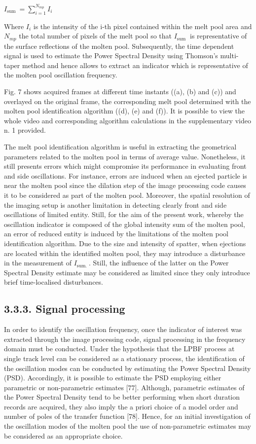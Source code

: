 \documentclass[10pt]{article}
\begin{document}
$I_{\text {sum }}=\sum_{i=1}^{N_{m p}} I_{i}$

Where $I_{i}$ is the intensity of the i-th pixel contained within the melt pool area and $N_{m p}$ the total number of pixels of the melt pool so that $I_{\text {sum }}$ is representative of the surface reflections of the molten pool. Subsequently, the time dependent signal is used to estimate the Power Spectral Density using Thomson's multi-taper method and hence allows to extract an indicator which is representative of the molten pool oscillation frequency.

Fig. 7 shows acquired frames at different time instants ((a), (b) and (c)) and overlayed on the original frame, the corresponding melt pool determined with the molten pool identification algorithm ((d), (e) and (f)). It is possible to view the whole video and corresponding algorithm calculations in the supplementary video n. 1 provided.

The melt pool identification algorithm is useful in extracting the geometrical parameters related to the molten pool in terms of average value. Nonetheless, it still presents errors which might compromise its performance in evaluating front and side oscillations. For instance, errors are induced when an ejected particle is near the molten pool since the dilation step of the image processing code causes it to be considered as part of the molten pool. Moreover, the spatial resolution of the imaging setup is another limitation in detecting clearly front and side oscillations of limited entity. Still, for the aim of the present work, whereby the oscillation indicator is composed of the global intensity sum of the molten pool, an error of reduced entity is induced by the limitations of the molten pool identification algorithm. Due to the size and intensity of spatter, when ejections are located within the identified molten pool, they may introduce a disturbance in the measurement of $I_{\text {sum. }}$. Still, the influence of the latter on the Power Spectral Density estimate may be considered as limited since they only introduce brief time-localised disturbances.

\subsection*{3.3.3. Signal processing}
In order to identify the oscillation frequency, once the indicator of interest was extracted through the image processing code, signal processing in the frequency domain must be conducted. Under the hypothesis that the LPBF process at single track level can be considered as a stationary process, the identification of the oscillation modes can be conducted by estimating the Power Spectral Density (PSD). Accordingly, it is possible to estimate the PSD employing either parametric or non-parametric estimates [77]. Although, parametric estimates of the Power Spectral Density tend to be better performing when short duration records are acquired, they also imply the a priori choice of a model order and number of poles of the transfer function [78]. Hence, for an initial investigation of the oscillation modes of the molten pool the use of non-parametric estimates may be considered as an appropriate choice.
\end{document}
